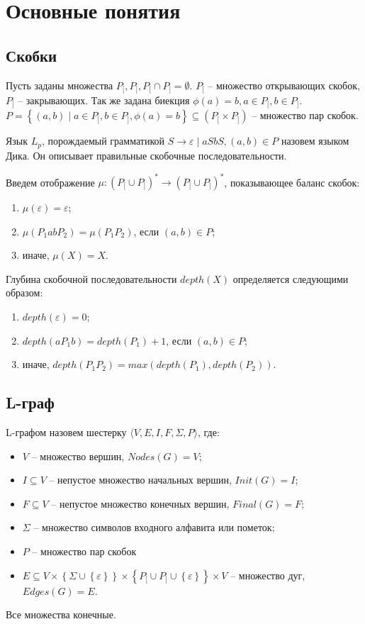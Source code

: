 \documentclass{article}
\begin{document}
\section{Основные понятия}
\subsection{Скобки}

Пусть заданы множества $P_[, P_], P_[ \cap P_] = \emptyset$. $P_[$ -- множество открывающих скобок, $P_]$ -- закрывающих.
Так же задана биекция $\phi(a) = b, a \in P_[, b \in P_]$.
$P = \left\{ (a, b) \mid a \in P_[, b \in P_], \phi(a) = b \right\} \subseteq \left( P_[ \times P_] \right)$ -- множество пар скобок.

Язык $L_p$, порождаемый грамматикой $S \rightarrow \varepsilon \mid a S b S, (a, b) \in P$ назовем языком Дика. Он описывает правильные скобочные последовательности.

Введем отображение $\mu : (P_[ \cup P_])^* \to (P_[ \cup P_])^* $, показывающее баланс скобок:
\begin{enumerate}
    \item $\mu(\varepsilon) = \varepsilon$;
    \item $\mu(P_1 a b P_2) = \mu(P_1 P_2)$, если $(a, b) \in P$;
    \item иначе, $\mu(X) = X$.
\end{enumerate}

Глубина скобочной последовательности $depth(X)$ определяется следующими образом:
\begin{enumerate}
    \item $depth(\varepsilon) = 0$;
    \item $depth(a P_1 b) = depth(P_1) + 1$, если $(a, b) \in P$;
    \item иначе, $depth(P_1 P_2) = max(depth(P_1), depth(P_2))$.
\end{enumerate}

\subsection{L-граф}
L-графом назовем шестерку $\langle V,E,I,F,\Sigma,P\rangle$, где:
\begin{itemize}
    \item $V$ -- множество вершин, $Nodes(G) = V$;
    \item $I \subseteq V$ -- непустое множество начальных вершин, $Init(G) = I$;
    \item $F \subseteq V$ -- непустое множество конечных вершин, $Final(G) = F$;
    \item $\Sigma$ -- множество символов входного алфавита или пометок;
    \item $P$ -- множество пар скобок
    \item $E \subseteq V 
                    \times \left\{ \Sigma \cup \left\{ \varepsilon \right\}\right\} 
                    \times \left\{ P_[ \cup P_] \cup \left\{ \varepsilon \right\} \right\} 
                    \times V $
        -- множество дуг, $Edges(G) = E$.
\end{itemize}
Все множества конечные.
\end{document}
